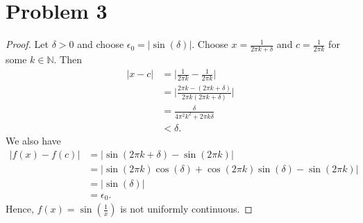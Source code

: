 \documentclass{article}
\newcommand{\N}{\mathbb{N}} %
\begin{document}
\section*{Problem 3}
\begin{proof}
	Let $\delta > 0$ and choose $\epsilon_0 = |\sin(\delta)|$. Choose $x = \frac{1}{2\pi k + \delta}$ and $c = \frac{1}{2 \pi k}$ for some $k \in \N$. Then
	\begin{align}
		|x - c| &= \Big|\frac{1}{2 \pi k} - \frac{1}{2 \pi k}\Big| \\
		&= \Big|\frac{2 \pi k - (2 \pi k + \delta)}{2 \pi k (2 \pi k + \delta)}\Big| \\
		&= \frac{\delta}{4 \pi^2 k^2 + 2 \pi k \delta} \\
		&< \delta.
	\end{align}
	We also have
	\begin{align}
		|f(x) - f(c)| &= |\sin(2 \pi k + \delta) - \sin(2 \pi k)| \\
		&= |\sin(2 \pi k)\cos(\delta) + \cos(2 \pi k)\sin(\delta) - \sin(2 \pi k)| \\
		&= |\sin(\delta)| \\
		&= \epsilon_0.
	\end{align}
	Hence, $f(x) = \sin\left(\frac{1}{x}\right)$ is not uniformly continuous.
\end{proof}
\end{document}
